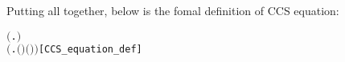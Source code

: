 Putting all together, below is the fomal
definition of \multivariate CCS equation:
\begin{alltt}
   \HOLTokenTurnstile{}    \HOLSymConst{\HOLTokenEquiv{}}
        \HOLSymConst{\HOLTokenConj{}}   \HOLSymConst{\ensuremath{=}}   \HOLSymConst{\HOLTokenConj{}}
       \ensuremath{(}\HOLTokenLambda{}.   \HOLSymConst{\HOLTokenSubset{}}  \ensuremath{)}  \HOLSymConst{\HOLTokenConj{}}
       \ensuremath{(}\HOLTokenLambda{}.  \ensuremath{(} \ensuremath{)} \ensuremath{(} \ensuremath{)}\ensuremath{)} \hfill{[CCS_equation_def]}
\end{alltt}

